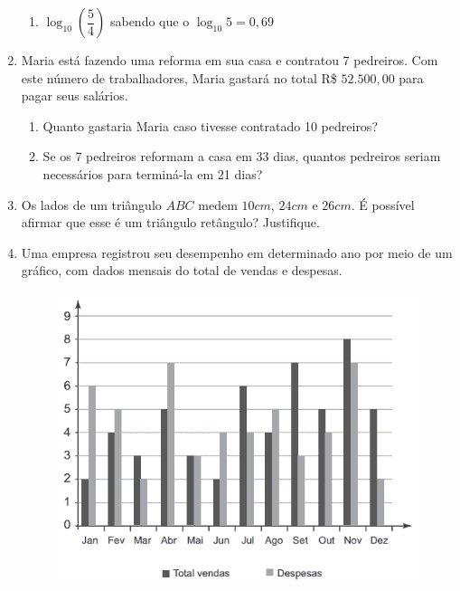 \documentclass[a4paper, 12pt]{article}
\begin{document}
\begin{enumerate}
\begin{enumerate}
    		\item $\log_{10}(\dfrac{5}{4})$ sabendo que o $\log_{10} 5 = 0,69$
\end{enumerate} 
\vspace{1cm}





	\item Maria está fazendo uma reforma em sua casa e contratou 7 pedreiros. Com este número de trabalhadores, Maria gastará no total R\$ $52.500,00$ para pagar seus salários.
	\begin{enumerate}	
    	\item Quanto gastaria Maria caso tivesse contratado 10 pedreiros?
    	\item Se os 7 pedreiros reformam a casa em 33 dias, quantos pedreiros seriam necessários para terminá-la em 21 dias?
	\end{enumerate}
\vspace{1cm}
 
 
 
 
	\item Os lados de um triângulo $ABC$ medem $10cm$, $24cm$ e $26cm$. É possível afirmar que esse é
um triângulo retângulo? Justifique.
\vspace{1cm}


	
	\item Uma empresa registrou seu desempenho em determinado ano por meio de um gráfico, com dados mensais do total de vendas e despesas.
		\begin{figure}[!h]
		\centering
		\includegraphics[scale = 0.50]{grafico}
		\end{figure}\\
			

\end{enumerate}
\end{document}
